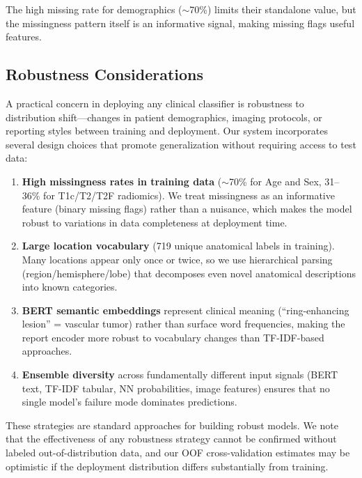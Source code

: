 The high missing rate for demographics ($\sim$70\%) limits their standalone value, but the missingness pattern itself is an informative signal, making missing flags useful features.

\subsection{Robustness Considerations}
\label{sec:shift}

A practical concern in deploying any clinical classifier is robustness to distribution shift---changes in patient demographics, imaging protocols, or reporting styles between training and deployment. Our system incorporates several design choices that promote generalization without requiring access to test data:

\begin{enumerate}
  \item \textbf{High missingness rates in training data} ($\sim$70\% for Age and Sex, 31--36\% for T1c/T2/T2F radiomics). We treat missingness as an informative feature (binary missing flags) rather than a nuisance, which makes the model robust to variations in data completeness at deployment time.
  \item \textbf{Large location vocabulary} (719 unique anatomical labels in training). Many locations appear only once or twice, so we use hierarchical parsing (region/hemisphere/lobe) that decomposes even novel anatomical descriptions into known categories.
  \item \textbf{BERT semantic embeddings} represent clinical meaning (``ring-enhancing lesion'' = vascular tumor) rather than surface word frequencies, making the report encoder more robust to vocabulary changes than TF-IDF-based approaches.
  \item \textbf{Ensemble diversity} across fundamentally different input signals (BERT text, TF-IDF tabular, NN probabilities, image features) ensures that no single model's failure mode dominates predictions.
\end{enumerate}

These strategies are standard approaches for building robust models. We note that the effectiveness of any robustness strategy cannot be confirmed without labeled out-of-distribution data, and our OOF cross-validation estimates may be optimistic if the deployment distribution differs substantially from training.
